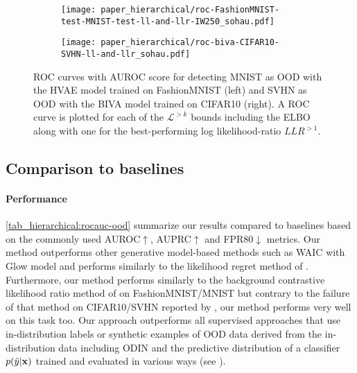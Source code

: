 {\begin{figure}
    \centering
    \begin{subfigure}[l]{0.495\columnwidth}
        \texttt{[image: paper\_hierarchical/roc-FashionMNIST-test-MNIST-test-ll-and-llr-IW250\_sohau.pdf]}
    \end{subfigure}
    \hfill
    \begin{subfigure}[r]{0.495\columnwidth}
        \texttt{[image: paper\_hierarchical/roc-biva-CIFAR10-SVHN-ll-and-llr\_sohau.pdf]}
    \end{subfigure}
    \caption[ROC curves for out of distribution detection (MNIST/FashionMNIST and SVHN/CIFAR10).]{%
        ROC curves with AUROC score for detecting MNIST as OOD with the HVAE model trained on FashionMNIST (left) and SVHN as OOD with the BIVA model trained on CIFAR10 (right). 
        A ROC curve is plotted for each of the $\mathcal{L}^{>k}$ bounds including the ELBO along with one for the best-performing log likelihood-ratio $LLR^{>1}$.
    }
    \label{fig_hierarchical:FMNIST-roc-llr and CIFAR10-roc-llr}
\end{figure}


\subsection{Comparison to baselines}
\paragraph{Performance} \cref{tab_hierarchical:rocauc-ood} summarize our results compared to baselines based on the commonly used AUROC$\uparrow$, AUPRC$\uparrow$ and FPR80$\downarrow$ metrics.
Our method outperforms other generative model-based methods such as WAIC \parencite{choi_waic_2019} with Glow model and performs similarly to the likelihood regret method of \parencite{xiao_likelihood_2020}.
Furthermore, our method performs similarly to the background contrastive likelihood ratio method of \textcite{ren_likelihood_2019} on FashionMNIST/MNIST but contrary to the failure of that method on CIFAR10/SVHN reported by \parencite{xiao_likelihood_2020}, our method performs very well on this task too.
Our approach outperforms all supervised approaches that use in-distribution labels or synthetic examples of OOD data derived from the in-distribution data including ODIN \parencite{liang_enhancing_2018} and the predictive distribution of a classifier $p(\hat{y}|{\mathbf{x}})$ trained and evaluated in various ways (see \textcite{ren_likelihood_2019}).

}
